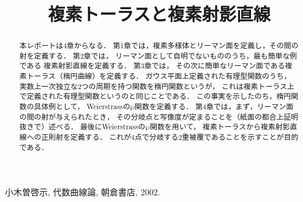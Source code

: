 \documentclass[11pt, a4paper, dvipdfmx]{jsarticle}
\theoremstyle{definition}
\theoremstyle{mystyle}
\numberwithin{equation}{section} %
\begin{document}
\title{複素トーラスと複素射影直線}
\date{}

\begin{titlepage}
\maketitle
\begin{abstract}
    本レポートは4章からなる．
    第1章では，複素多様体とリーマン面を定義し，その間の射を定義する．
    第2章では，
    リーマン面として自明でないもののうち，最も簡単な例である
    複素射影直線を定義する．
    第3章では，
    その次に簡単なリーマン面である複素トーラス（楕円曲線）を定義する．
    ガウス平面上定義された有理型関数のうち，
    実数上一次独立な2つの周期を持つ関数を楕円関数というが，
    これは複素トーラス上で定義された有理型関数というのと同じことである．
    この事実を示したのち，楕円関数の具体例として，
    Weierstrassの$\wp$関数を定義する．
    第4章では，まず，リーマン面の間の射が与えられたとき，
    その分岐点と写像度が定まることを（紙面の都合上証明抜きで）述べる．
    最後にWeierstrassの$\wp$関数を用いて，
    複素トーラスから複素射影直線への正則射を定義する．
    これが4点で分岐する2重被覆であることを示すことが目的である．
\end{abstract}
\thispagestyle{empty}
\end{titlepage}





\begin{thebibliography}{15}

 小木曽啓示, 代数曲線論, 朝倉書店, 2002. 

\end{thebibliography}
\end{document}
